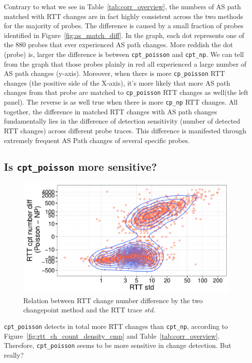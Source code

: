 Contrary to what we see in Table~\ref{tab:corr_overview}, the numbers of AS path matched with RTT changes are in fact highly consistent across the two methods for the majority of probes.
The difference is caused by a small fraction of probes identified in Figure~\ref{fig:as_match_diff}.
In the graph, each dot represents one of the 880 probes that ever experienced AS path changes.
More reddish the dot (probe) is, larger the difference is between \texttt{cpt\_poisson} and \texttt{cpt\_np}.
We can tell from the graph that those probes plainly in red all experienced a large number of AS path changes (y-axis).
Moreover, when there is more \texttt{cp\_poisson} RTT changes (the positive side of the X-axis), it's more likely that more AS path changes from that probe are matched to \texttt{cp\_poisson} RTT changes as well(the left panel).
The reverse is as well true when there is more \texttt{cp\_np} RTT changes.
All together, the difference in matched RTT changes with AS path changes fundamentally lies in the difference of detection sensitivity (number of detected RTT changes) across different probe traces.
This difference is manifested through extremely frequent AS Path changes of several specific probes.


\subsection{Is \texttt{cpt\_poisson} more sensitive?}
\label{sec:over_sensitive}
\begin{figure}[!htb]
\centering
\includegraphics[width=.64\textwidth]{gfx/chap4/cpt_diff_vs_std.pdf}
\caption{Relation between RTT change number difference by the two changepoint method and the RTT trace $std$.}
\label{fig:cpt_diff_vs_std}
\end{figure}

\texttt{cpt\_poisson} detects in total more RTT changes than \texttt{cpt\_np}, according to Figure~\ref{fig:rtt_ch_count_density_cmp} and Table~\ref{tab:corr_overview}.
Therefore, \texttt{cpt\_poisson} seems to be more sensitive in change detection. But really?

